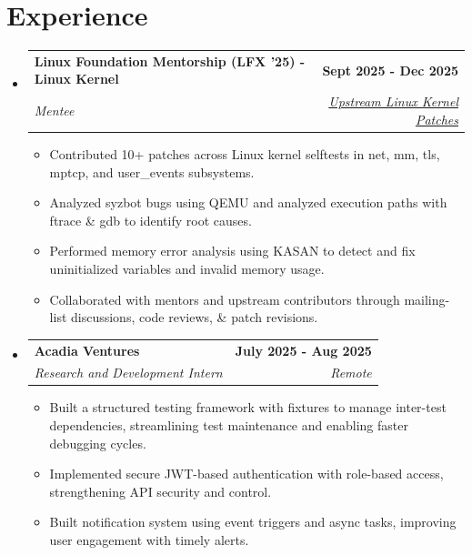 \documentclass[letterpaper,11pt]{article}
\makeatletter
\newcommand{\resumeItem}[1]{
\item\small{
    {#1 \vspace{-2pt}}
  }
}
\newcommand{\resumeSubheading}[4]{
  \vspace{-2pt}
\item
  \begin{tabular*}{1.0\textwidth}[t]{l@{\extracolsep{\fill}}r}
    \textbf{#1} & \textbf{\small #2} \\
    \textit{\small#3} & \textit{\small #4} \\
  \end{tabular*}\vspace{-7pt}
}
\newcommand{\resumeSubHeadingListStart}{
\begin{itemize}[leftmargin=0.0in, label={}]}
\newcommand{\resumeSubHeadingListEnd}{
\end{itemize}}
\newcommand{\resumeItemListStart}{
\begin{itemize}}
\newcommand{\resumeItemListEnd}{
\end{itemize}\vspace{-5pt}}
\makeatother
\begin{document}
\section{Experience}
\resumeSubHeadingListStart
\vspace{-2pt}
\resumeSubheading
{Linux Foundation Mentorship (LFX '25) - Linux Kernel}{Sept 2025 - Dec 2025}
{Mentee}{\href{https://git.kernel.org/pub/scm/linux/kernel/git/torvalds/linux.git/log/?qt=grep\&q=ankitkhushwaha.linux\%40gmail.com}{Upstream
Linux Kernel Patches}}
\vspace{-6pt}
\resumeItemListStart
\resumeItem{Contributed 10+ patches across Linux kernel selftests in
net, mm, tls, mptcp, and user\_events subsystems.}
\resumeItem{Analyzed syzbot bugs using QEMU and
analyzed execution paths with ftrace \& gdb to identify root causes.}
\resumeItem{Performed memory error analysis using KASAN to detect and
fix uninitialized variables and invalid memory usage.}
\resumeItem{Collaborated with mentors and upstream contributors through mailing-list discussions, code reviews, \& patch revisions.}

\resumeItemListEnd
\resumeSubHeadingListEnd
\vspace{-25pt}

\resumeSubHeadingListStart

\resumeSubheading
{Acadia Ventures}{July 2025 - Aug 2025}
{Research and Development Intern}{Remote}
\resumeItemListStart
\resumeItem{Built a structured testing framework with fixtures to
  manage inter-test dependencies,
streamlining test maintenance and enabling faster debugging cycles.}
\resumeItem{Implemented secure JWT-based authentication with
role-based access, strengthening API security and control.}
\resumeItem{Built notification system using event
triggers and async tasks, improving user engagement with timely alerts.}
\resumeItemListEnd

\resumeSubHeadingListEnd
\vspace{-16pt}

\end{document}
